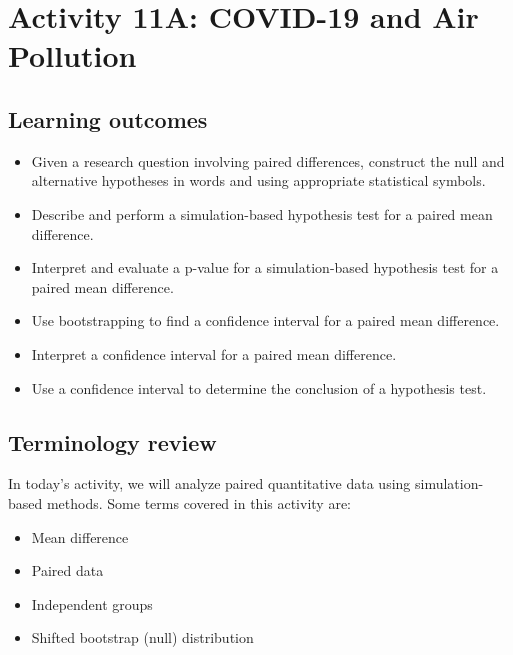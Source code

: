 \documentclass[
]{report}
\begin{document}
\newpage

\hypertarget{activity-11a-covid-19-and-air-pollution}{%
\section{Activity 11A: COVID-19 and Air Pollution}\label{activity-11a-covid-19-and-air-pollution}}


\hypertarget{learning-outcomes-20}{%
\subsection{Learning outcomes}\label{learning-outcomes-20}}

\begin{itemize}
\item
  Given a research question involving paired differences, construct the null and alternative hypotheses
  in words and using appropriate statistical symbols.
\item
  Describe and perform a simulation-based hypothesis test for a paired mean difference.
\item
  Interpret and evaluate a p-value for a simulation-based hypothesis test for a paired mean difference.
\item
  Use bootstrapping to find a confidence interval for a paired mean difference.
\item
  Interpret a confidence interval for a paired mean difference.
\item
  Use a confidence interval to determine the conclusion of a hypothesis test.
\end{itemize}

\hypertarget{terminology-review-17}{%
\subsection{Terminology review}\label{terminology-review-17}}

In today's activity, we will analyze paired quantitative data using simulation-based methods. Some terms covered in this activity are:

\begin{itemize}
\item
  Mean difference
\item
  Paired data
\item
  Independent groups
\item
  Shifted bootstrap (null) distribution
\end{itemize}
\end{document}
